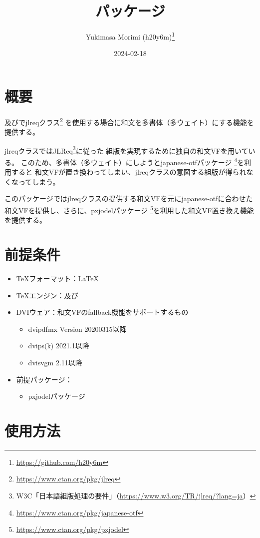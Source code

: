 \documentclass[dvipdfmx,a4paper]{jlreq}
\title{\pkg{jlreq-deluxe}パッケージ}
\author{Yukimasa Morimi (h20y6m)\thanks{\url{https://github.com/h20y6m}}}
\date{2024-02-18}
\newcommand{\pkg}[1]{\textsf{#1}}
\newcommand{\cls}[1]{\textsf{#1}}
\begin{document}
\maketitle


\section{概要}

\pLaTeX 及び\upLaTeX で\cls{jlreq}クラス\footnote{\url{https://www.ctan.org/pkg/jlreq}}%
を使用する場合に和文を多書体（多ウェイト）にする機能を提供する。

\cls{jlreq}クラスではJLReq\footnote{W3C「日本語組版処理の要件」（\url{https://www.w3.org/TR/jlreq/?lang=ja}）}に従った
組版を実現するために独自の和文VFを用いている。
このため、多書体（多ウェイト）にしようと\pkg{japanese-otf}パッケージ
\footnote{\url{https://www.ctan.org/pkg/japanese-otf}}を利用すると
和文VFが置き換わってしまい、\pkg{jlreq}クラスの意図する組版が得られなくなってしまう。

このパッケージでは\cls{jlreq}クラスの提供する和文VFを元に\pkg{japanese-otf}に合わせた
和文VFを提供し、さらに、\pkg{pxjodel}パッケージ
\footnote{\url{https://www.ctan.org/pkg/pxjodel}}を利用した和文VF置き換え機能を提供する。


\section{前提条件}

\begin{itemize}
\item \TeX フォーマット：\LaTeX
\item \TeX エンジン：\pTeX 及び\upTeX
\item DVIウェア：和文VFのfallback機能をサポートするもの
  \begin{itemize}
  \item dvipdfmx Version 20200315以降
  \item dvips(k) 2021.1以降
  \item dvisvgm 2.11以降
  \end{itemize}
\item 前提パッケージ：
  \begin{itemize}
  \item \pkg{pxjodel}パッケージ
  \end{itemize}
\end{itemize}


\section{使用方法}
\end{document}
